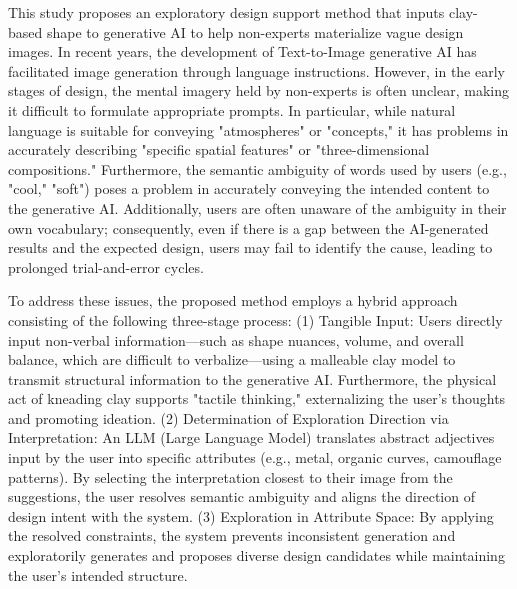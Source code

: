 \documentclass{kuisthesis}
\begin{document}
\begin{eabstract}
This study proposes an exploratory design support method that inputs clay-based shape to generative AI to help non-experts materialize vague design images.
In recent years, the development of Text-to-Image generative AI has facilitated image generation through language instructions.
However, in the early stages of design, the mental imagery held by non-experts is often unclear, making it difficult to formulate appropriate prompts. 
In particular, while natural language is suitable for conveying "atmospheres" or "concepts," it has problems in accurately describing "specific spatial features" or "three-dimensional compositions." 
Furthermore, the semantic ambiguity of words used by users (e.g., "cool," "soft") poses a problem in accurately conveying the intended content to the generative AI. 
Additionally, users are often unaware of the ambiguity in their own vocabulary; consequently, even if there is a gap between the AI-generated results and the expected design, users may fail to identify the cause, leading to prolonged trial-and-error cycles.

To address these issues, the proposed method employs a hybrid approach consisting of the following three-stage process: 
(1) Tangible Input: Users directly input non-verbal information—such as shape nuances, volume, and overall balance, which are difficult to verbalize—using a malleable clay model to transmit structural information to the generative AI. 
Furthermore, the physical act of kneading clay supports "tactile thinking," externalizing the user's thoughts and promoting ideation. 
(2) Determination of Exploration Direction via Interpretation: An LLM (Large Language Model) translates abstract adjectives input by the user into specific attributes (e.g., metal, organic curves, camouflage patterns). 
By selecting the interpretation closest to their image from the suggestions, the user resolves semantic ambiguity and aligns the direction of design intent with the system. 
(3) Exploration in Attribute Space: By applying the resolved constraints, the system prevents inconsistent generation and exploratorily generates and proposes diverse design candidates while maintaining the user's intended structure.


\end{eabstract}
\end{document}
